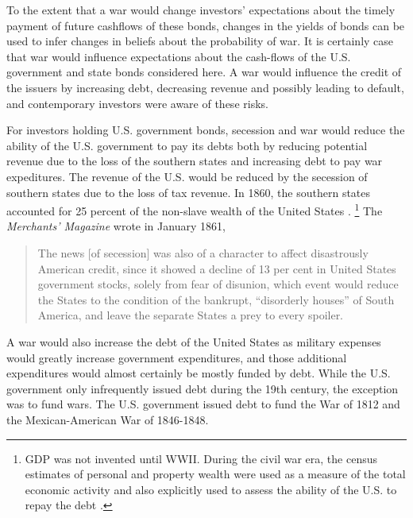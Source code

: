 \documentclass[11pt, oneside, article]{memoir}\usepackage[]{graphicx}\usepackage[]{color}
\begin{document}
To the extent that a war would change investors' expectations about the timely payment of future cashflows of these bonds, changes in the yields of bonds can be used to infer changes in beliefs about the probability of war.
It is certainly case that war would influence expectations about the cash-flows of the U.S. government and state bonds considered here.
A war would influence the credit of the issuers by increasing debt, decreasing revenue and possibly leading to default, and contemporary investors were aware of these risks.

For investors holding U.S. government bonds, secession and war would reduce the ability of the U.S. government to pay its debts both by reducing potential revenue due to the loss of the southern states and increasing debt to pay war expeditures.
The revenue of the U.S. would be reduced by the secession of southern states due to the loss of tax revenue. In 1860, the southern states accounted for 25 percent of the non-slave wealth of the United States \parencite[11]{Elder1865}.%
\footnote{GDP was not invented until WWII.
  During the civil war era, the census estimates of personal and property wealth were used as a measure of the total economic activity and also explicitly used to assess the ability of the U.S. to repay the debt \parencites{Elder1863}{Elder1865}.
}
The \textit{Merchants' Magazine} wrote in January 1861,
\begin{quote}
   The news [of secession] was also of a character to affect disastrously American credit, since it showed a decline of 13 per cent in United States government stocks, solely from fear of disunion, which event would reduce the States to the condition of the bankrupt, ``disorderly houses'' of South America, and leave the separate States a prey to every spoiler. \parencite[79]{HomansDana1861a}
\end{quote}
A war would also increase the debt of the United States as military expenses would greatly increase government expenditures, and those additional expenditures would almost certainly be mostly funded by debt.
While the U.S. government only infrequently issued debt during the 19th century, the exception was to fund wars.
The U.S. government issued debt to fund the War of 1812 and the Mexican-American War of 1846-1848.
\end{document}
